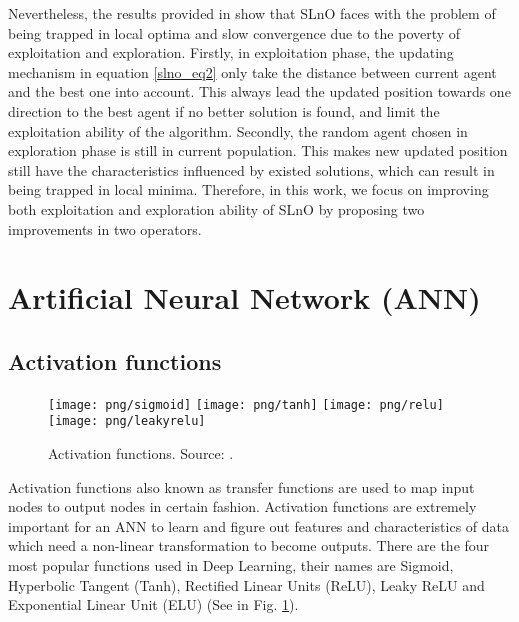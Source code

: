 \documentclass[../main.tex]{subfiles}
\begin{document}
	Nevertheless, the results provided in \cite{masadeh2019sea} show that SLnO faces with the problem of being trapped in local optima and slow convergence due to the poverty of
exploitation and exploration. Firstly, in exploitation phase, the updating mechanism in equation \ref{slno_eq2} only take the distance between current agent and the best one into account. This always lead the updated position towards one direction to the best agent if no better solution is found, and limit the exploitation ability of the algorithm. Secondly, the random agent chosen in exploration phase is still in current population. This makes new updated position still have the characteristics influenced by existed solutions, which can result in being trapped in local minima. Therefore, in this work, we focus on improving both exploitation and exploration ability of SLnO by proposing two improvements in two operators.

\section{Artificial Neural Network (ANN)}
\label{sec:ann}
\subsection{Activation functions}
\label{ann_act_func}

\begin{figure}[!ht] 
   \centering
   \texttt{[image: png/sigmoid]}
   \texttt{[image: png/tanh]}
   \texttt{[image: png/relu]}
   \texttt{[image: png/leakyrelu]}
  \caption{Activation functions. Source: \cite{stacey2018activation}.}
  \label{fig_activation} 
\end{figure}

	Activation functions also known as transfer functions are used to map input nodes to output nodes in certain fashion. Activation functions are extremely important for an ANN to learn and figure out features and characteristics of data which need a non-linear transformation to become outputs. There are the four most popular functions used in Deep Learning, their names are Sigmoid, Hyperbolic Tangent (Tanh), Rectified Linear Units (ReLU), Leaky ReLU and Exponential Linear Unit (ELU) (See in Fig. \ref{fig_activation}).
\end{document}
